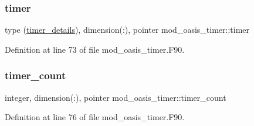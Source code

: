 \subsubsection{\texorpdfstring{timer}{timer}}
{\footnotesize\ttfamily type (\hyperlink{structmod__oasis__timer_1_1timer__details}{timer\+\_\+details}), dimension(\+:), pointer mod\+\_\+oasis\+\_\+timer\+::timer\hspace{0.3cm}{\ttfamily [private]}}



Definition at line 73 of file mod\+\_\+oasis\+\_\+timer.\+F90.

\mbox{\label{namespacemod__oasis__timer_a225db1b2b8bd57f0567d37b5c4d00ca3}} 
\subsubsection{\texorpdfstring{timer\+\_\+count}{timer\_count}}
{\footnotesize\ttfamily integer, dimension(\+:), pointer mod\+\_\+oasis\+\_\+timer\+::timer\+\_\+count\hspace{0.3cm}{\ttfamily [private]}}



Definition at line 76 of file mod\+\_\+oasis\+\_\+timer.\+F90.


